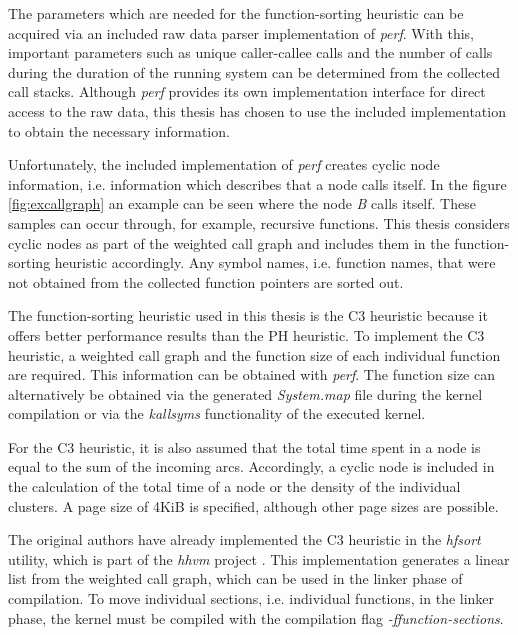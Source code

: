 The parameters which are needed for the function-sorting heuristic can be acquired via an included raw data parser implementation of \textit{perf}. With this, important parameters such as unique caller-callee calls and the number of calls during the duration of the running system can be determined from the collected call stacks. Although \textit{perf} provides its own implementation interface for direct access to the raw data, this thesis has chosen to use the included implementation to obtain the necessary information.

Unfortunately, the included implementation of \textit{perf} creates cyclic node information, i.e. information which describes that a node calls itself. In the figure \ref{fig:excallgraph} an example can be seen where the node \textit{B} calls itself.  These samples can occur through, for example, recursive functions. This thesis considers cyclic nodes as part of the weighted call graph and includes them in the function-sorting heuristic accordingly. Any symbol names, i.e. function names, that were not obtained from the collected function pointers are sorted out.

\newpage

The function-sorting heuristic used in this thesis is the C3 heuristic because it offers better performance results than the PH heuristic. To implement the C3 heuristic, a weighted call graph and the function size of each individual function are required. This information can be obtained with \textit{perf}. The function size can alternatively be obtained via the generated \textit{System.map} file during the kernel compilation or via the \textit{kallsyms} functionality of the executed kernel.

For the C3 heuristic, it is also assumed that the total time spent in a node is equal to the sum of the incoming arcs. Accordingly, a cyclic node is included in the calculation of the total time of a node or the density of the individual clusters. A page size of 4KiB is specified, although other page sizes are possible.

The original authors have already implemented the C3 heuristic in the \textit{hfsort} utility, which is part of the \textit{hhvm} project \cite{hhvm}. This implementation generates a linear list from the weighted call graph, which can be used in the linker phase of compilation. To move individual sections, i.e. individual functions, in the linker phase, the kernel must be compiled with the compilation flag \textit{-ffunction-sections}.